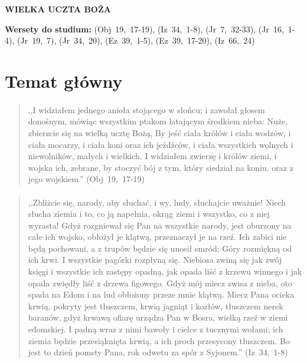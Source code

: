 \documentclass[10pt,a4paper,oneside]{article}
\begin{document}
\centerline{\textbf{\MakeUppercase{Wielka uczta Boża}}}
\begin{center}
\textbf{Wersety do studium:} \mbox{(Obj 19, 17-19)}, \mbox{(Iz 34, 1-8)}, \mbox{(Jr 7, 32-33)}, \mbox{(Jr 16, 1-4)}, \mbox{(Jr 19, 7)}, \mbox{(Jr 34, 20)}, \mbox{(Ez 39, 1-5)}, \mbox{(Ez 39, 17-20)}, \mbox{(Iz 66, 24)}
\end{center}
\section{Temat główny}
\paragraph{}
\begin{quote}
,,I widziałem jednego anioła stojącego w słońcu; i zawołał głosem donośnym, mówiąc wszystkim ptakom latającym środkiem nieba: Nuże, zbierzcie się na wielką ucztę Bożą, By jeść ciała królów i ciała wodzów, i ciała mocarzy, i ciała koni oraz ich jeźdźców, i ciała wszystkich wolnych i niewolników, małych i wielkich. I widziałem zwierzę i królów ziemi, i wojska ich, zebrane, by stoczyć bój z tym, który siedział na koniu. oraz z jego wojskiem.'' \mbox{(Obj 19, 17-19)}
\end{quote}
\paragraph{}
\begin{quote}
,,Zbliżcie się, narody, aby słuchać, i wy, ludy, słuchajcie uważnie! Niech słucha ziemia i to, co ją napełnia, okrąg ziemi i wszystko, co z niej wyrasta! Gdyż rozgniewał się Pan na wszystkie narody, jest oburzony na całe ich wojsko, obłożył je klątwą, przeznaczył je na rzeź. Ich zabici nie będą pochowani, a z trupów będzie się unosił smród; Góry rozmiękną od ich krwi. I wszystkie pagórki rozpłyną się. Niebiosa zwiną się jak zwój księgi i wszystkie ich zastępy opadną, jak opada liść z krzewu winnego i jak opada zwiędły liść z drzewa figowego. Gdyż mój miecz zwisa z nieba, oto spada na Edom i na lud obłożony przeze mnie klątwą. Miecz Pana ocieka krwią, pokryty jest tłuszczem, krwią jagniąt i kozłów, tłuszczem nerek baranów, gdyż krwawą ofiarę urządza Pan w Bosra, wielką rzeź w ziemi edomskiej. I padną wraz z nimi bawoły i cielce z tucznymi wołami; ich ziemia będzie przesiąknięta krwią, a ich proch przesycony tłuszczem. Bo jest to dzień pomsty Pana, rok odwetu za spór z Syjonem.'' \mbox{(Iz 34, 1-8)}
\end{quote}
\end{document}
